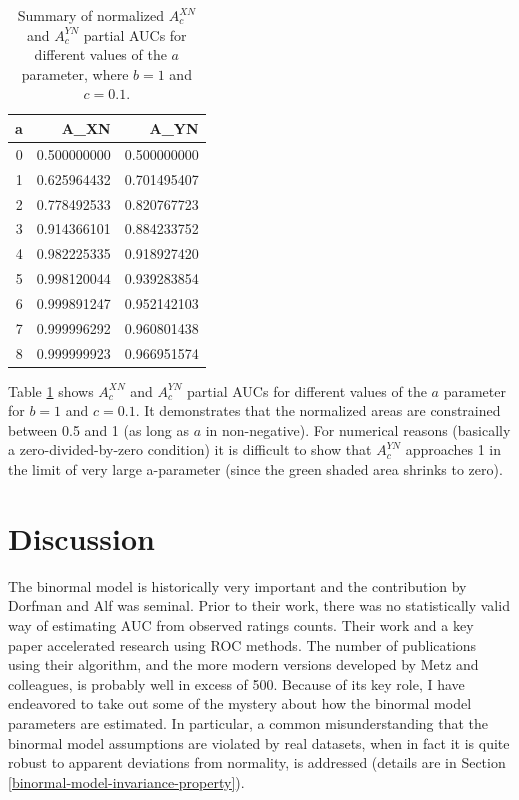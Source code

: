 \documentclass[
]{book}
\begin{document}
\begin{table}

\caption{\label{tab:summary-table-partial-normalized-areas}Summary of normalized $A_c^{XN}$ and $A_c^{YN}$ partial AUCs for different values of the $a$ parameter, where $b = 1$ and $c = 0.1$.}
\centering
\begin{tabular}[t]{r|r|r}
\hline
a & A_XN & A_YN\\
\hline
0 & 0.500000000 & 0.500000000\\
\hline
1 & 0.625964432 & 0.701495407\\
\hline
2 & 0.778492533 & 0.820767723\\
\hline
3 & 0.914366101 & 0.884233752\\
\hline
4 & 0.982225335 & 0.918927420\\
\hline
5 & 0.998120044 & 0.939283854\\
\hline
6 & 0.999891247 & 0.952142103\\
\hline
7 & 0.999996292 & 0.960801438\\
\hline
8 & 0.999999923 & 0.966951574\\
\hline
\end{tabular}
\end{table}

Table \ref{tab:summary-table-partial-normalized-areas} shows \(A_c^{XN}\) and \(A_c^{YN}\) partial AUCs for different values of the \(a\) parameter for \(b = 1\) and \(c = 0.1\). It demonstrates that the normalized areas are constrained between 0.5 and 1 (as long as \(a\) in non-negative). For numerical reasons (basically a zero-divided-by-zero condition) it is difficult to show that \(A_c^{YN}\) approaches 1 in the limit of very large a-parameter (since the green shaded area shrinks to zero).

\hypertarget{binormal-model-discussion}{%
\section{Discussion}\label{binormal-model-discussion}}

The binormal model is historically very important and the contribution by Dorfman and Alf \citep{RN1081} was seminal. Prior to their work, there was no statistically valid way of estimating AUC from observed ratings counts. Their work and a key paper \citep{RN1487} accelerated research using ROC methods. The number of publications using their algorithm, and the more modern versions developed by Metz and colleagues, is probably well in excess of 500. Because of its key role, I have endeavored to take out some of the mystery about how the binormal model parameters are estimated. In particular, a common misunderstanding that the binormal model assumptions are violated by real datasets, when in fact it is quite robust to apparent deviations from normality, is addressed (details are in Section \ref{binormal-model-invariance-property}).
\end{document}
